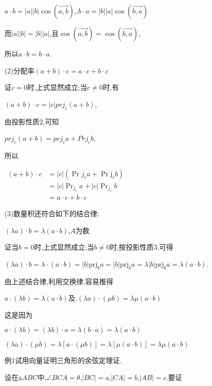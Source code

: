\documentclass[oneside]{book}
\begin{document}
$a \cdot b = |a||b|\cos (\overrightarrow {a,b} )$,.$b \cdot a = |b||a|\cos (\overrightarrow {b,a} )$

而$|a||b| = |b||a|$,且$\cos (\overrightarrow {a,b} ) = \cos (\overrightarrow {b,a} )$,

所以$a \cdot b = b \cdot a$.

(2)分配率$(a + b) \cdot c = a \cdot c + b \cdot c$

证$c=0$时,上式显然成立;当$c \ne 0$时,有

$\left( {a + b} \right) \cdot c = |c|pr{j_c}\left( {a + b} \right)$,

由投影性质2,可知

$pr{j_c}(a + b) = {{pr}}{{{j}}_c}a + {{Pr}}{{{j}}_c}b$, 

所以

$\begin{aligned}(a+b) \cdot c &=|c|\left(\operatorname{Pr} j_{c} a+\operatorname{Pr} \mathrm{j}_{c} b\right) \\ &=|c| \operatorname{Pr}_{j_{c}} a+|c| \operatorname{Pr}_{j_{c}} b \\ &=a \cdot c+b \cdot c \end{aligned}$

(3)数量积还符合如下的结合律:

$\left( {\lambda a} \right) \cdot b = \lambda \left( {a \cdot b} \right)$,$A$为数

证当$b=0$时,上式显然成立;当$b \ne 0$时,按投影性质3,可得

$\left( {\lambda a} \right) \cdot b = \lambda  \cdot \left( {a \cdot b} \right) = |b|{\text{pr}}{{\text{j}}_b}a = |b|{\text{pr}}{{\text{j}}_b}a = \lambda |b|{\text{pr}}{{\text{j}}_b}a = \lambda (a \cdot b)$.

由上述结合律,利用交换律,容易推得

$a \cdot \left( {\lambda b} \right) = \lambda (a \cdot b)$及.$\left( {\lambda a} \right) \cdot \left( {\mu b} \right) = \lambda \mu \left( {a \cdot b} \right)$

这是因为

$a \cdot \left( {\lambda b} \right) = \left( {\lambda b} \right) \cdot a = \lambda \left( {b \cdot a} \right) = \lambda \left( {a \cdot b} \right)$

$(\lambda a) \cdot \left( {\mu b} \right) = \lambda [a \cdot (\mu b)] = \lambda [\mu (a \cdot b)] = \lambda \mu (a \cdot b)$

例1试用向量证明三角形的余弦定理证.

设在$\vartriangle ABC$中,$\angle BCA = \theta $,$|BC| = a$,$|CA| = b$,$|AB| = c$.要证
\end{document}
